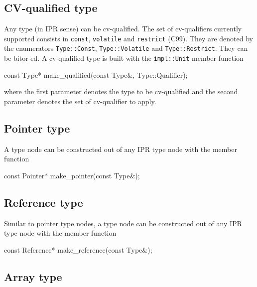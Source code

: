 \documentclass[a4paper,12pt]{article}
\begin{document}
\subsection{CV-qualified type}
\label{sec:type.cv-qualified}
Any type (in IPR sense) can be cv-qualified.  The set of cv-qualifiers
currently supported consists in \texttt{const}, \texttt{volatile} and
\texttt{restrict} (C99).  They are denoted by the enumerators
\texttt{Type::Const}, \texttt{Type::Volatile} and \texttt{Type::Restrict}.
They can be bitor-ed.  A cv-qualified type is built with the
\texttt{impl::Unit} member function
\begin{Program}
  const Type* make_qualified(const Type&, Type::Qualifier);
\end{Program}
where the first parameter denotes the type to be cv-qualified and the second
parameter denotes the set of cv-qualifier to apply. 

\subsection{Pointer type}
\label{sec:type.pointer}

A  type node can be constructed out of any IPR type node
with the  member function
\begin{Program}
  const Pointer* make_pointer(const Type&);
\end{Program}

\subsection{Reference type}
\label{sec:type.reference}

Similar to pointer type nodes, a  type node can be
constructed out of any IPR type node with the  member
function 
\begin{Program}
  const Reference* make_reference(const Type&);
\end{Program}


\subsection{Array type}
\label{sec:type.array}
\end{document}
